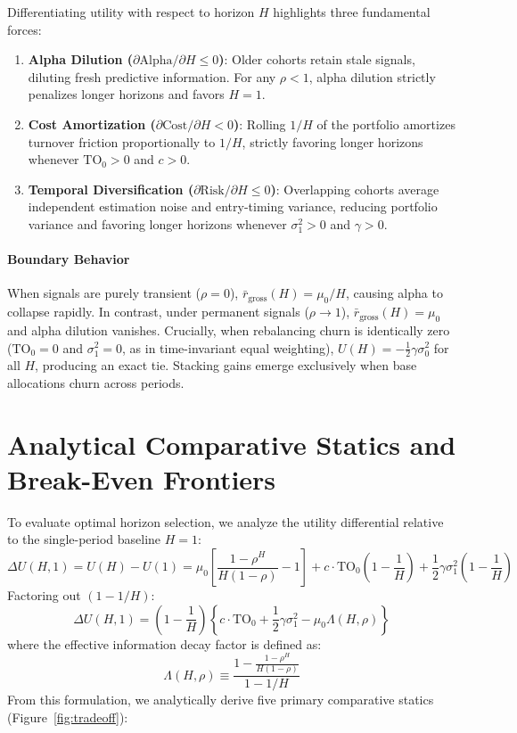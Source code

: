 \documentclass[11pt,a4paper]{article}
\theoremstyle{definition}
\begin{document}
Differentiating utility with respect to horizon $H$ highlights three fundamental forces:
\begin{enumerate}
    \item \textbf{Alpha Dilution ($\partial \text{Alpha}/\partial H \le 0$)}: Older cohorts retain stale signals, diluting fresh predictive information. For any $\rho < 1$, alpha dilution strictly penalizes longer horizons and favors $H=1$.
    \item \textbf{Cost Amortization ($\partial \text{Cost}/\partial H < 0$)}: Rolling $1/H$ of the portfolio amortizes turnover friction proportionally to $1/H$, strictly favoring longer horizons whenever $\text{TO}_0 > 0$ and $c > 0$.
    \item \textbf{Temporal Diversification ($\partial \text{Risk}/\partial H \le 0$)}: Overlapping cohorts average independent estimation noise and entry-timing variance, reducing portfolio variance and favoring longer horizons whenever $\sigma_1^2 > 0$ and $\gamma > 0$.
\end{enumerate}

\paragraph{Boundary Behavior}
When signals are purely transient ($\rho = 0$), $\bar{r}_{\text{gross}}(H) = \mu_0 / H$, causing alpha to collapse rapidly. In contrast, under permanent signals ($\rho \to 1$), $\bar{r}_{\text{gross}}(H) = \mu_0$ and alpha dilution vanishes. Crucially, when rebalancing churn is identically zero ($\text{TO}_0 = 0$ and $\sigma_1^2 = 0$, as in time-invariant equal weighting), $U(H) = -\frac{1}{2}\gamma \sigma_0^2$ for all $H$, producing an exact tie. Stacking gains emerge exclusively when base allocations churn across periods.


\section{Analytical Comparative Statics and Break-Even Frontiers}
\label{sec:comparative_statics}

To evaluate optimal horizon selection, we analyze the utility differential relative to the single-period baseline $H=1$:
\begin{equation}
\Delta U(H, 1) = U(H) - U(1) = \mu_0 \left[ \frac{1 - \rho^H}{H(1 - \rho)} - 1 \right] + c \cdot \text{TO}_0 \left(1 - \frac{1}{H}\right) + \frac{1}{2}\gamma \sigma_1^2 \left(1 - \frac{1}{H}\right)
\end{equation}
Factoring out $(1 - 1/H)$:
\begin{equation}
\Delta U(H, 1) = \left(1 - \frac{1}{H}\right) \left\{ c \cdot \text{TO}_0 + \frac{1}{2}\gamma \sigma_1^2 - \mu_0 \Lambda(H, \rho) \right\}
\end{equation}
where the effective information decay factor is defined as:
\begin{equation}
\Lambda(H, \rho) \equiv \frac{1 - \frac{1 - \rho^H}{H(1 - \rho)}}{1 - 1/H}
\end{equation}
From this formulation, we analytically derive five primary comparative statics (Figure~\ref{fig:tradeoff}):
\end{document}
